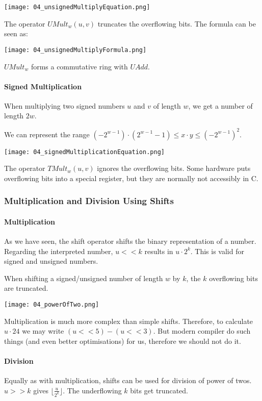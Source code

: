 \texttt{[image: 04\_unsignedMultiplyEquation.png]}

The operator $UMult_w(u,v)$ truncates the overflowing bits. The formula can be seen as:

\texttt{[image: 04\_unsignedMultiplyFormula.png]}

$UMult_w$ forms a commutative ring with $UAdd$.

\paragraph{Signed Multiplication}
When multiplying two signed numbers $u$ and $v$ of length $w$, we get a number of length $2w$.

We can represent the range $(-2^{w - 1}) \cdot (2^{w - 1} - 1) \le x \cdot y \le (-2^{w -1})^2$.

\texttt{[image: 04\_signedMultiplicationEquation.png]}

The operator $TMult_w(u,v)$ ignores the overflowing bits. Some hardware puts overflowing bits into a special register, but they are normally not accessibly in C.

\subsubsection{Multiplication and Division Using Shifts}
\paragraph{Multiplication}
As we have seen, the shift operator shifts the binary representation of a number. Regarding the interpreted number, $u << k$ results in $u \cdot 2^k$. This is valid for signed and unsigned numbers.

When shifting a signed/unsigned number of length $w$ by $k$, the $k$ overflowing bits are truncated.

\texttt{[image: 04\_powerOfTwo.png]}

Multiplication is much more complex than simple shifts. Therefore, to calculate $u \cdot 24$ we may write $(u << 5) - (u << 3)$. But modern compiler do such things (and even better optimisations) for us, therefore we should not do it.

\paragraph{Division}
Equally as with multiplication, shifts can be used for division of power of twos. $u >> k$ gives $\lfloor \frac{u}{2^k} \rfloor$. The underflowing $k$ bits get truncated.

